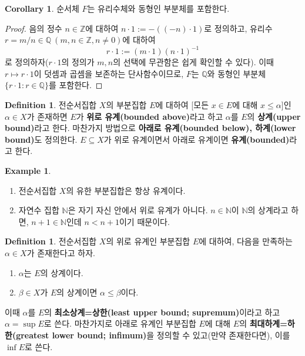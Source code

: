 \documentclass[11pt]{book}
\numberwithin{equation}{chapter}
\def\NN{\mathbb{N}}
\def\ZZ{\mathbb{Z}}
\def\QQ{\mathbb{Q}}
\theoremstyle{definition}
\newtheorem{cor}[thm]{Corollary}
\newtheorem{defn}[thm]{Definition}
\newtheorem*{ex}{Example}
\begin{document}
    \begin{cor} \label{cor 1.2.7}
        순서체 \(F\)는 유리수체와 동형인 부분체를 포함한다.
    \end{cor}
    \begin{proof}
        음의 정수 \(n \in \ZZ \)에 대하여 \(n \cdot 1 := -((-n) \cdot 1)\)로 정의하고, 유리수 \(r = m/n \in \QQ \ (m, n \in \ZZ, n \ne 0)\)에 대하여
        \[
        r \cdot 1 := (m \cdot 1)(n \cdot 1)^{-1}    
        \]
        로 정의하자(\(r \cdot 1\)의 정의가 \(m, n\)의 선택에 무관함은 쉽게 확인할 수 있다). 이때 \(r \mapsto r \cdot 1\)이 덧셈과 곱셈을 보존하는 단사함수이므로, \(F\)는 \(\QQ\)와 동형인 부분체 \(\{r \cdot 1: r \in \QQ\}\)를 포함한다.
    \end{proof}

    \begin{defn}
        전순서집합 \(X\)의 부분집합 \(E\)에 대하여 [모든 \(x \in E\)에 대해 \(x \le \alpha\)]인 \(\alpha \in X\)가 존재하면 \(E\)가 \textbf{위로 유계(bounded above)}라고 하고 \(\alpha\)를 \(E\)의 \textbf{상계(upper bound)}라고 한다. 마찬가지 방법으로 \textbf{아래로 유계(bounded below), 하계(lower bound)}도 정의한다. \(E \subseteq X\)가 위로 유계이면서 아래로 유계이면 \textbf{유계(bounded)}라고 한다.
    \end{defn}
    \begin{ex}
        \quad

        \begin{enumerate}[label=(\alph*), leftmargin=2\parindent]
            \item 전순서집합 \(X\)의 유한 부분집합은 항상 유계이다.
            \item 자연수 집합 \(\NN\)은 자기 자신 안에서 위로 유계가 아니다. \(n \in \NN\)이 \(\NN\)의 상계라고 하면, \(n + 1 \in \NN\)인데 \(n < n+1\)이기 때문이다.
        \end{enumerate}
    \end{ex}

    \begin{defn}
        전순서집합 \(X\)의 위로 유계인 부분집합 \(E\)에 대하여, 다음을 만족하는 \(\alpha \in X\)가 존재한다고 하자.
        \begin{enumerate}[label=(\alph*), leftmargin=2\parindent]
            \item \(\alpha\)는 \(E\)의 상계이다.
            \item \(\beta \in X\)가 \(E\)의 상계이면 \(\alpha \le \beta\)이다.
        \end{enumerate}
        이때 \(\alpha\)를 \(E\)의 \textbf{최소상계=상한(least upper bound; supremum)}이라고 하고 \(\alpha = \sup E\)로 쓴다. 마찬가지로 아래로 유계인 부분집합 \(E\)에 대해 \(E\)의 \textbf{최대하계=하한(greatest lower bound; infimum)}을 정의할 수 있고(만약 존재한다면), 이를 \(\inf E\)로 쓴다.
    \end{defn}
\end{document}
